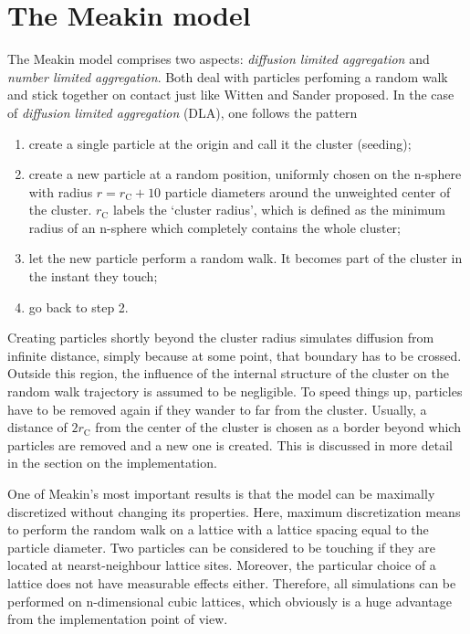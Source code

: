 \documentclass[twocolumn,10pt]{scrartcl}
\begin{document}
    \section{The Meakin model}
        The Meakin model comprises two aspects: \emph{diffusion limited aggregation} and \emph{number limited
        aggregation}. Both deal with particles perfoming a random walk and stick together on contact just like
        Witten and Sander proposed. In the case of \emph{diffusion limited aggregation} (DLA), one follows the
        pattern
        \begin{enumerate}
            \item create a single particle at the origin and call it the cluster (seeding);
            \item create a new particle at a random position, uniformly chosen on the n-sphere with radius
                $r=r_\mathrm{C}+10$ particle diameters around the unweighted center of the cluster.
                $r_\mathrm{C}$ labels the `cluster radius', which
                is defined as the minimum radius of an n-sphere which completely contains the whole cluster;
            \item let the new particle perform a random walk. It becomes part of the cluster in the instant
                they touch;
            \item go back to step 2.
        \end{enumerate}
        Creating particles shortly beyond the cluster radius simulates diffusion from infinite distance, simply
        because at some point, that boundary has to be crossed. Outside this region, the influence of the
        internal structure of the cluster on the random walk trajectory is assumed to be negligible. To speed things up,
        particles have to be removed again if they wander to far from the cluster. Usually, a distance of
        $2r_\mathrm{C}$ from the center of the cluster is chosen as a border beyond which particles are removed
        and a new one is created. This is discussed in more detail in the section on the implementation.
       
        One of Meakin's most important results is that the model can be maximally discretized without changing
        its properties. Here, maximum discretization means to perform the random walk on a lattice with
        a lattice spacing equal to the particle diameter. Two particles can be considered to be touching if
        they are located at nearst-neighbour lattice sites. Moreover, the particular choice of a lattice does
        not have measurable effects either. Therefore, all simulations can be performed on n-dimensional
        cubic lattices, which obviously is a huge advantage from the implementation point of view.
\end{document}
